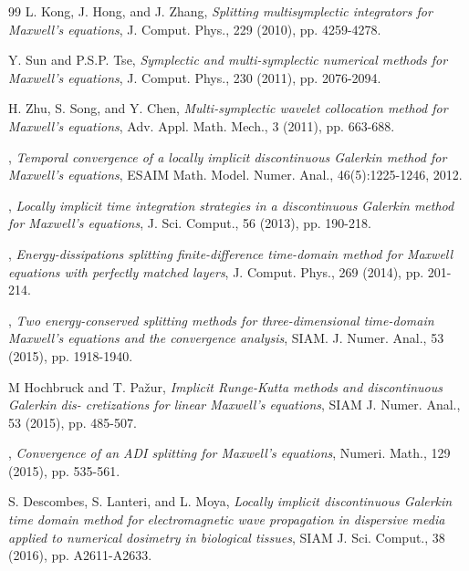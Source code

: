 \documentclass[10pt,reqno]{amsart}
\renewcommand{\(}{\left(}
\renewcommand{\)}{\right)}
\numberwithin{equation}{section}
\begin{document}
\begin{thebibliography}{99}
 {\sc L.  Kong, J.  Hong, and J.  Zhang}, \emph{Splitting multisymplectic integrators for Maxwell's equations}, J. Comput. Phys., 229 (2010), pp. 4259-4278.

 {\sc Y. Sun and P.S.P. Tse}, \emph{Symplectic and multi-symplectic numerical methods for Maxwell's equations}, J. Comput. Phys., 230 (2011), pp. 2076-2094.


 {\sc H. Zhu, S. Song, and Y. Chen}, \emph{Multi-symplectic wavelet collocation method
	for Maxwell's equations}, Adv. Appl. Math. Mech., 3 (2011), pp. 663-688.
	

	

, \emph{Temporal convergence of a locally implicit discontinuous Galerkin method for Maxwell's equations}, ESAIM Math. Model. Numer. Anal., 46(5):1225-1246, 2012.


, \emph{Locally implicit time integration strategies in a discontinuous Galerkin method for Maxwell's equations}, J. Sci. Comput., 56 (2013), pp. 190-218.


, \emph{Energy-dissipations splitting finite-difference
	time-domain method for Maxwell equations with perfectly matched layers}, J. Comput. Phys., 269 (2014), pp.  201-214.


, \emph{Two energy-conserved splitting methods for three-dimensional time-domain Maxwell's equations and the convergence analysis}, SIAM. J. Numer. Anal.,  53 (2015), pp.  1918-1940.


 {\sc M Hochbruck and T. Pa\v{z}ur}, \emph{Implicit Runge-Kutta methods and discontinuous Galerkin dis- cretizations for linear Maxwell's equations}, SIAM J. Numer. Anal., 53 (2015), pp.  485-507.


, \emph{Convergence of an ADI splitting for Maxwell's equations}, Numeri. Math., 129 (2015), pp.  535-561.


 {\sc S. Descombes, S. Lanteri, and L. Moya}, \emph{Locally implicit discontinuous Galerkin time domain method for electromagnetic wave propagation in dispersive media applied to numerical dosimetry in biological tissues}, SIAM J. Sci. Comput., 38 (2016), pp.  A2611-A2633.




\end{thebibliography}
\end{document}
